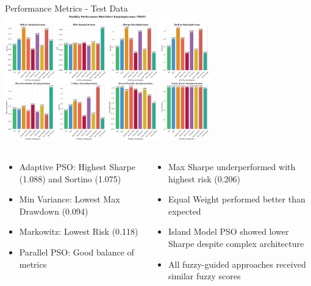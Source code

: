 \documentclass[aspectratio=169,xcolor=table]{beamer}
\begin{document}
\begin{frame}{Performance Metrics - Test Data}
  \centering
  \includegraphics[width=\textwidth, height=5.5cm, keepaspectratio]{test_performance_metrics_comparison.png}
  
  \begin{columns}
    \begin{column}{0.48\textwidth}
      \begin{tcolorbox}[
        enhanced,
        colback=green!5,
        colframe=green!70,
        arc=2mm,
        title=Top Performers,
        fonttitle=\bfseries\large,
        boxrule=0.5mm
      ]
        \begin{itemize}
          \item Adaptive PSO: Highest Sharpe (1.088) and Sortino (1.075)
          \item Min Variance: Lowest Max Drawdown (0.094)
          \item Markowitz: Lowest Risk (0.118)
          \item Parallel PSO: Good balance of metrics
        \end{itemize}
      \end{tcolorbox}
    \end{column}
    \begin{column}{0.48\textwidth}
      \begin{tcolorbox}[
        enhanced,
        colback=red!5,
        colframe=red!70,
        arc=2mm,
        title=Surprising Results,
        fonttitle=\bfseries\large,
        boxrule=0.5mm
      ]
        \begin{itemize}
          \item Max Sharpe underperformed with highest risk (0.206)
          \item Equal Weight performed better than expected
          \item Island Model PSO showed lower Sharpe despite complex architecture
          \item All fuzzy-guided approaches received similar fuzzy scores
        \end{itemize}
      \end{tcolorbox}
    \end{column}
  \end{columns}
\end{frame}
\end{document}
